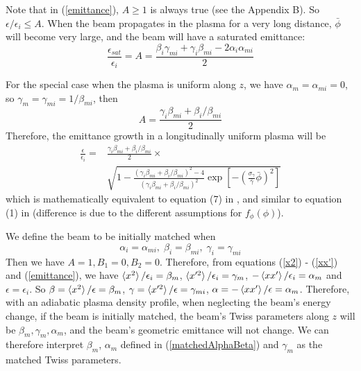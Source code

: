\documentclass[%
reprint, superscriptaddress,
 amsmath,amssymb, aps,
prstab,
]{revtex4-2}
\begin{document}
Note that in (\ref{emittance}), $A \geqslant 1$ is always true (see the Appendix B). So
$\epsilon/\epsilon_i \leqslant A$. When the beam propagates in the
plasma for a very long distance, $\bar \phi$ will become very large, and
the beam will have a saturated emittance: 
\begin{equation}
\frac{\epsilon_{sat}}{\epsilon_i}=A = \frac{\beta_i \gamma_{mi}+\gamma_i \beta_{mi}-2\alpha_i \alpha_{mi}}{2} 
\label{A}
\end{equation}

For the special case when the plasma is uniform along $z$, we have $\alpha_{m} = \alpha_{mi} = 0$, so $\gamma_{m} = \gamma_{mi} = 1 /
\beta_{mi}$, then
\[ A = \frac{\gamma_i \beta_{mi} + \beta_i / \beta_{mi}}{2} \]
Therefore, the emittance growth in a longitudinally uniform plasma will
be 
\begin{equation}
\begin{aligned}
 \frac{\epsilon}{\epsilon_i}=& \frac{\gamma_i \beta_{mi} + \beta_i / \beta_{mi}}{2} \times
 \\
 &\sqrt{1 -\frac{(\gamma_i \beta_{mi} + \beta_i / \beta_{mi})^2-4}{(\gamma_i \beta_{mi} + \beta_i / \beta_{mi})^2}
\exp[-(\frac{\sigma_\gamma}{\bar \gamma}\bar \phi)^2]} 
\label{emittance_uniform}
\end{aligned}
\end{equation}
which is mathematically equivalent to equation (7) in \cite{German2018}, and similar to equation (1) in \cite{Xinlu2016} (difference is due to the different assumptions for $f_\phi(\phi)$).

We define the beam to be initially matched when
\begin{equation}
\alpha_i  = \alpha_{mi} ,\; \beta_i  = \beta_{mi} , \; \gamma_i  = \gamma_{mi} 
\label{match} 
\end{equation} 
Then we have $A = 1, B_1 = 0, B_2 = 0$.
Therefore, from equations (\ref{x2}) - (\ref{xx'}) and
(\ref{emittance}), we have $\braket{x^2}/\epsilon_i = \beta_m$,
$\braket{x'^2}/\epsilon_i = \gamma_m$, $-\braket{xx'}/\epsilon_i =
\alpha_m$ and $\epsilon = \epsilon_i$. So $\beta = \braket{x^2}/\epsilon = \beta_m$, $\gamma = \braket{x'^2}/\epsilon = \gamma_{mi}$, $\alpha = -\braket{xx'}/\epsilon = \alpha_m$.
Therefore, with an
adiabatic plasma density profile, when neglecting the beam's energy
change, if the beam is initially matched, the beam's Twiss parameters
along $z$ will be $\beta_m, \gamma_m, \alpha_m$, and
the beam's geometric emittance will not change. We can therefore interpret $\beta_m$, $\alpha_m$ defined in (\ref{matchedAlphaBeta}) and $\gamma_m$ as the matched Twiss parameters.
\end{document}
